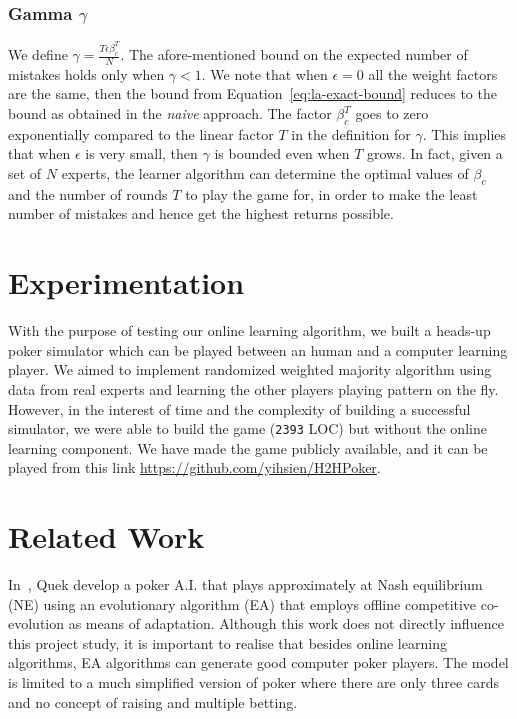 \documentclass[12pt]{article}
\begin{document}
\subsubsection*{Gamma $\gamma$}
We define $\gamma=\frac{T\epsilon\beta_c^T}{N}$. The afore-mentioned bound on the expected number of mistakes holds only when
$\gamma < 1$. We note that when $\epsilon = 0$ \ie all the weight factors are the same, then the bound from Equation~\ref{eq:la-exact-bound}
reduces to the bound as obtained in the {\em naive} approach. The factor $\beta_c^T$ goes to zero exponentially compared to the linear
factor $T$ in the definition for $\gamma$. This implies that when $\epsilon$ is very small, then $\gamma$ is bounded even when $T$ grows.
In fact, given a set of $N$ experts, the learner algorithm can determine the optimal values of $\beta_c$ and the number of rounds $T$ to play
the game for, in order to make the least number of mistakes and hence get the highest returns possible.

\section{Experimentation}
\label{sec:experimentation}
\noindent With the purpose of testing our online learning algorithm, we built a heads-up poker simulator
which can be played between an human and a computer learning player. We aimed to implement randomized weighted
majority algorithm using data from real experts and learning the other players playing pattern on the fly. However,
in the interest of time and the complexity of building a successful simulator, we were able to build the game (\texttt{2393} LOC)
but without the online learning component. We have made the game publicly available, and it can be played from this
link \url{https://github.com/yihsien/H2HPoker}.

\section{Related Work}
\label{sec:related}
\noindent In~\cite{quek2009evolving}, Quek \etal develop a poker A.I. that plays approximately at Nash equilibrium (NE) using an
evolutionary algorithm (EA) that employs offline competitive co-evolution as means of adaptation. Although this work does not directly
influence this project study, it is important to realise that besides online learning algorithms, EA algorithms can generate
good computer poker players. The model is limited to a much simplified version of poker where there are only three cards
and no concept of raising and multiple betting.\\
\end{document}
